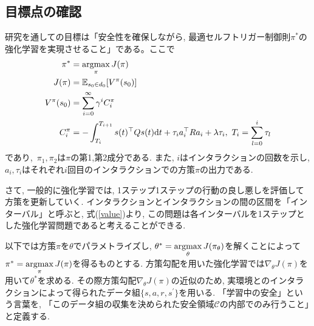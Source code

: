 \documentclass{jsarticle}
\newcommand{\argmax}{\mathop{\rm argmax}\limits}
\newcommand{\expect}{\mathbb{E}}
\begin{document}
\subsection{目標点の確認}
研究を通しての目標は「安全性を確保しながら, 最適セルフトリガー制御則$\pi^{*}$の強化学習を実現させること」である。ここで
\begin{align}
	\pi^{*} &= \argmax_{\pi}J(\pi) \label{optimal_policy}\\
	J(\pi) &= \expect_{s_0\in d_0}[V^{\pi}(s_0)] \\
	V^{\pi}(s_0) &= \sum_{i=0}^{\infty} \gamma^i C^{\pi}_i \label{value} \\
	C^{\pi}_i &= -\int_{T_i}^{T_{i+1}}s(t)^{\top}Qs(t)\textrm{d}t +\tau_ia_i^{\top}Ra_i + \lambda \tau_i, ~T_i = \sum_{l=0}^{i} \tau_l \label{reward}
\end{align}
であり,~$\pi_1, \pi_2$は$\pi$の第1,第2成分である. また, $i$はインタラクションの回数を示し, $a_i, \tau_i$はそれぞれ$i$回目のインタラクションでの方策$\pi$の出力である. \par
さて, 一般的に強化学習では, 1ステップ1ステップの行動の良し悪しを評価して方策を更新していく. 
インタラクションとインタラクションの間の区間を「インターバル」と呼ぶと, 式(\ref{value})より, この問題は各インターバルを1ステップとした強化学習問題であると考えることができる. \par
以下では方策$\pi$を$\theta$でパラメトライズし, $\theta^{*} = \argmax_{\theta}J(\pi_{\theta})$を解くことによって$\pi^{*} = \argmax_{\pi}J(\pi)$を得るものとする. 方策勾配を用いた強化学習では$\nabla_{\theta}J(\pi)$を用いて$\theta^{*}$を求める. その際方策勾配$\nabla_{\theta}J(\pi)$の近似のため, 実環境とのインタラクションによって得られたデータ組$\{s,a,r,s^{\prime}\}$を用いる. 「学習中の安全」という言葉を, 「このデータ組の収集を決められた安全領域$\mathcal{C}$の内部でのみ行うこと」と定義する.\par
\end{document}
